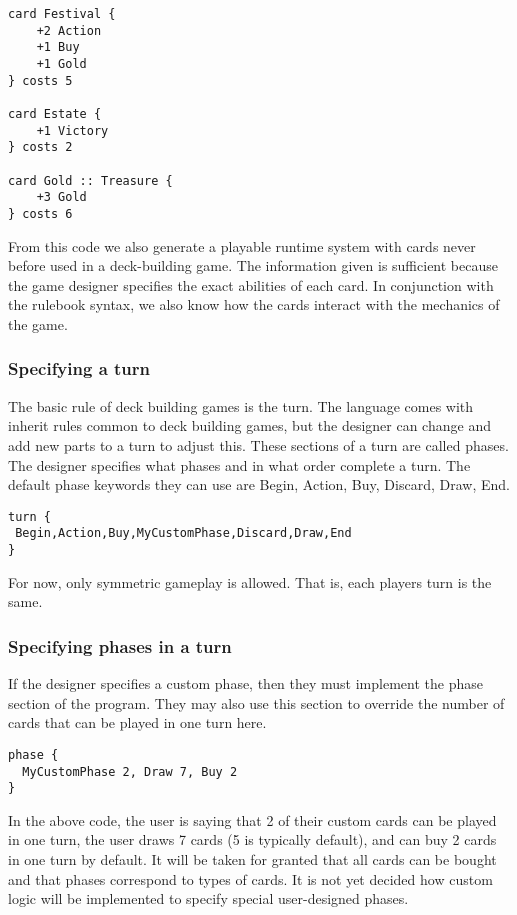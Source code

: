 \documentclass{acm_proc_article-sp}
\begin{document}
\begin{verbatim}
card Festival {
    +2 Action
    +1 Buy
    +1 Gold
} costs 5

card Estate {
    +1 Victory
} costs 2

card Gold :: Treasure {
    +3 Gold
} costs 6
\end{verbatim}

From this code we also generate a playable runtime system with cards never before
used in a deck-building game. The information given is sufficient because the
game designer specifies the exact abilities of each card. In conjunction with the
rulebook syntax, we also know how the cards interact with the mechanics of the game.

\subsubsection{Specifying a turn}
The basic rule of deck building games is the turn. The language comes with inherit rules common to deck building games, but the designer can change and add new parts to a turn to adjust this. These sections of a turn are called phases. The designer specifies what phases and in what order complete a turn. The default phase keywords they can use are Begin, Action, Buy, Discard, Draw, End. 
\begin{verbatim}
turn {
 Begin,Action,Buy,MyCustomPhase,Discard,Draw,End 
}
\end{verbatim}

For now, only symmetric gameplay is allowed. That is, each players turn is the same.

\subsubsection{Specifying phases in a turn}
If the designer specifies a custom phase, then they must implement the phase section of the program. They may also use this section to override the number of cards that can be played in one turn here.

\begin{verbatim}
phase {
  MyCustomPhase 2, Draw 7, Buy 2
}
\end{verbatim}
In the above code, the user is saying that 2 of their custom cards can be played in one turn, the user draws 7 cards (5 is typically default), and can buy 2 cards in one turn by default. It will be taken for granted that all cards can be bought and that phases correspond to types of cards. It is not yet decided how custom logic will be implemented to specify special user-designed phases.
\end{document}
